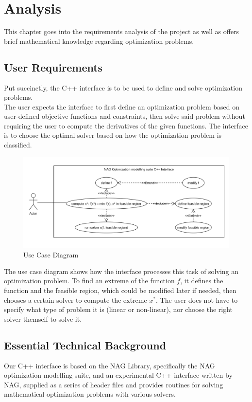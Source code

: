 \documentclass{book}
\begin{document}
\chapter{Analysis} \label{ch:analysis}
This chapter goes into the requirements analysis of the project as well as offers brief mathematical knowledge regarding optimization problems.
\section{User Requirements}
Put succinctly, the C++ interface is to be used to define and solve optimization problems.\\
\newline
The user expects the interface to first define an optimization problem based on user-defined objective functions and constraints, then solve said problem without requiring the user to compute the derivatives of the given functions. The interface is to choose the optimal solver based on how the optimization problem is classified.\\
\begin{figure}[!h]
\includegraphics[width=\textwidth]{use case.pdf}
\caption{\small Use Case Diagram}
\end{figure}
\newline
The use case diagram shows how the interface processes this task of solving an optimization problem. To find an extreme of the function $f$, it defines the function and the feasible region, which could be modified later if needed, then chooses a certain solver to compute the extreme $x^{*}$. The user does not have to specify what type of problem it is (linear or non-linear), nor choose the right solver themself to solve it. 
\newpage

\section{Essential Technical Background}
Our C++ interface is based on the NAG Library, specifically the NAG optimization modelling suite, and an experimental C++ interface written by NAG, supplied as a series of header files and provides routines for solving mathematical optimization problems with various solvers.
\end{document}
